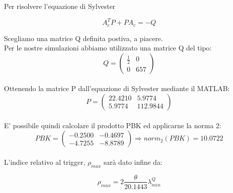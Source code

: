 \documentclass[a4paper,13pt]{article}
\begin{document}
	Per risolvere l'equazione di Sylvester
	
\begin{equation*}
	A_{c}^{T}P + PA_{c} = -Q              %
\end{equation*}

	Scegliamo una matrice Q definita postiva, a piacere.\\
	Per le nostre simulazioni abbiamo utilizzato una matrice Q del tipo:\\

\begin{equation*}
	Q=
\begin{pmatrix}

	\frac{1}{2}&0\\0&657

\end{pmatrix}
\end{equation*}\\
	
	Ottenendo la matrice P dall'equazione di Sylvester mediante il MATLAB:\\
	
\begin{equation*}
	P=
\begin{pmatrix}

	22.4210&5.9774\\5.9774&112.9844

\end{pmatrix}
\end{equation*}\\

	E' possibile quindi calcolare il prodotto PBK ed applicarne la norma 2:\\
	
\begin{equation*}
	PBK=
\begin{pmatrix}

	-0.2500&-0.4697\\-4.7255&-8.8789

\end{pmatrix}
	\Rightarrow norm_{2}(PBK)=10.0722
\end{equation*}\\

	L'indice relativo al trigger, $\rho_{max}$ sarà dato infine da:
	
\begin{equation*}
	\rho_{max}=2\frac{\theta}{20.1443} \lambda_{min}^{Q}
\end{equation*}\\
\end{document}
